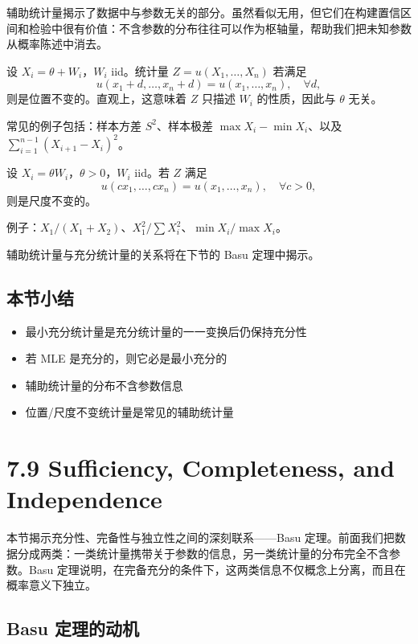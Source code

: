辅助统计量揭示了数据中与参数无关的部分。虽然看似无用，但它们在构建置信区间和检验中很有价值：不含参数的分布往往可以作为枢轴量，帮助我们把未知参数从概率陈述中消去。

\begin{example}[位置不变统计量]\label{ex:location-invariant}
设 $X_i = \theta + W_i$，$W_i$ iid。统计量 $Z = u(X_1, \ldots, X_n)$ 若满足
\[
u(x_1+d, \ldots, x_n+d) = u(x_1, \ldots, x_n),\quad \forall d,
\]
则是位置不变的。直观上，这意味着 $Z$ 只描述 $W_i$ 的性质，因此与 $\theta$ 无关。

常见的例子包括：样本方差 $S^2$、样本极差 $\max X_i - \min X_i$、以及 $\sum_{i=1}^{n-1}(X_{i+1} - X_i)^2$。
\end{example}

\begin{example}[尺度不变统计量]\label{ex:scale-invariant}
设 $X_i = \theta W_i$，$\theta > 0$，$W_i$ iid。若 $Z$ 满足
\[
u(cx_1, \ldots, cx_n) = u(x_1, \ldots, x_n),\quad \forall c > 0,
\]
则是尺度不变的。

例子：$X_1/(X_1+X_2)$、$X_1^2/\sum X_i^2$、$\min X_i/\max X_i$。
\end{example}

辅助统计量与充分统计量的关系将在下节的 Basu 定理中揭示。

\subsection*{本节小结}

\begin{itemize}
\item 最小充分统计量是充分统计量的一一变换后仍保持充分性
\item 若 MLE 是充分的，则它必是最小充分的
\item 辅助统计量的分布不含参数信息
\item 位置/尺度不变统计量是常见的辅助统计量
\end{itemize}

\section{7.9 Sufficiency, Completeness, and Independence}\label{sec:7.9}

本节揭示充分性、完备性与独立性之间的深刻联系——Basu 定理。前面我们把数据分成两类：一类统计量携带关于参数的信息，另一类统计量的分布完全不含参数。Basu 定理说明，在完备充分的条件下，这两类信息不仅概念上分离，而且在概率意义下独立。

\subsection{Basu 定理的动机}

